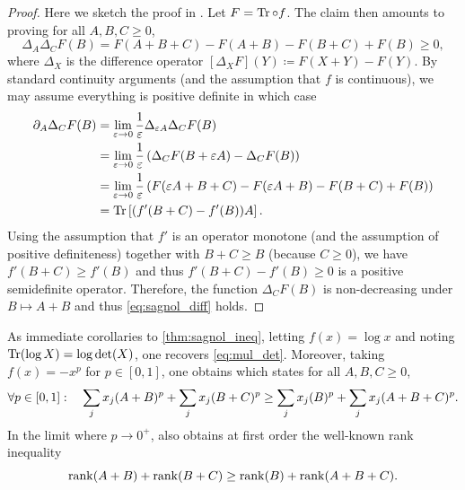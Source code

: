 \documentclass[notitlepage, 10pt]{article}
\begin{document}
\begin{proof}
    Here we sketch the proof in \cite[Section 2.1]{sagnol2013approximation}.
    Let $F = \operatorname{Tr} \circ f$. The claim then amounts to proving for all $A,B,C\geq 0$,
    \begin{equation}
        \label{eq:sagnol_diff}
        \Delta_{A}\Delta_{C} F(B) = F(A+B+C) - F(A+B) - F(B+C) + F(B) \geq 0,
    \end{equation}
    where $\Delta_X$ is the difference operator $[\Delta_X F](Y) \coloneqq F(X+Y) - F(Y)$.
    By standard continuity arguments (and the assumption that $f$ is continuous), we may assume everything is positive definite in which case
    \begin{align}
        \partial_{A} \Delta_C F(B)
        &= \lim_{\varepsilon \to 0} \frac{1}{\varepsilon} \Delta_{\varepsilon A} \Delta_C F(B) \\
        &= \lim_{\varepsilon \to 0} \frac{1}{\varepsilon} \left( \Delta_C F (B+\varepsilon A) - \Delta_C F(B) \right) \\
        &= \lim_{\varepsilon \to 0} \frac{1}{\varepsilon} \left( F(\varepsilon A+B+C) - F(\varepsilon A + B) - F(B+C) + F(B) \right) \\
        &= \operatorname{Tr}\left[(f'(B+C)-f'(B)) A \right]. \label{eq:sagnol_final_step}
    \end{align}
    Using the assumption that $f'$ is an operator monotone (and the assumption of positive definiteness) together with $B+C \geq B$ (because $C \geq 0$), we have $f'(B+C) \geq f'(B)$ and thus $f'(B+C)-f'(B) \geq 0$ is a positive semidefinite operator.
    Therefore, the function $\Delta_C F(B)$ is non-decreasing under $B\mapsto A+B$ and thus \cref{eq:sagnol_diff} holds.
\end{proof}
As immediate corollaries to \cref{thm:sagnol_ineq}, letting $f(x) = \log x$ and noting $\operatorname{Tr}(\log X) = \log \det(X)$, one recovers \cref{eq:mul_det}.
Moreover, taking $f(x) = -x^{p}$ for $p \in [0,1]$, one obtains \cite[Lemma 5.3]{bouhtou2008optimization} which states for all $A,B,C \geq 0$,
\begin{equation}
    \label{eq:bouhtou_ineq}
    \forall p \in [0,1] : \quad \sum_{j}x_j(A+B)^p + \sum_{j}x_j(B+C)^p \geq \sum_{j}x_j(B)^p + \sum_{j}x_j(A+B+C)^p.
\end{equation}
In the limit where $p \to 0^+$, \citeauthor{sagnol2013approximation} also obtains at first order the well-known rank inequality \cite[Proposition A.1]{sagnol2013approximation}
\begin{equation}
    \operatorname{rank}(A+B) + \operatorname{rank}(B+C) \geq \operatorname{rank}(B) + \operatorname{rank}(A+B+C).
\end{equation}
\end{document}
